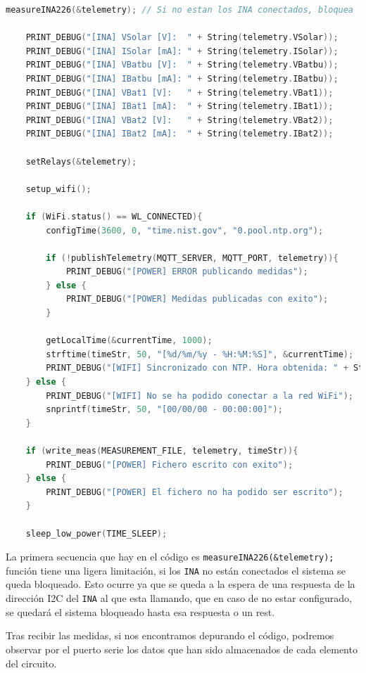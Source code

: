 \begin{lstlisting}[captionpos=b, caption={Codigo de la funcion loop}, language=c++]
    measureINA226(&telemetry); // Si no estan los INA conectados, bloquea

    PRINT_DEBUG("[INA] VSolar [V]:  " + String(telemetry.VSolar));
    PRINT_DEBUG("[INA] ISolar [mA]: " + String(telemetry.ISolar));
    PRINT_DEBUG("[INA] VBatbu [V]:  " + String(telemetry.VBatbu));
    PRINT_DEBUG("[INA] IBatbu [mA]: " + String(telemetry.IBatbu));
    PRINT_DEBUG("[INA] VBat1 [V]:   " + String(telemetry.VBat1));
    PRINT_DEBUG("[INA] IBat1 [mA]:  " + String(telemetry.IBat1));
    PRINT_DEBUG("[INA] VBat2 [V]:   " + String(telemetry.VBat2));
    PRINT_DEBUG("[INA] IBat2 [mA]:  " + String(telemetry.IBat2));

    setRelays(&telemetry);

    setup_wifi();

    if (WiFi.status() == WL_CONNECTED){
        configTime(3600, 0, "time.nist.gov", "0.pool.ntp.org");
        
        if (!publishTelemetry(MQTT_SERVER, MQTT_PORT, telemetry)){
            PRINT_DEBUG("[POWER] ERROR publicando medidas");
        } else {
            PRINT_DEBUG("[POWER] Medidas publicadas con exito");
        }

        getLocalTime(&currentTime, 1000);
        strftime(timeStr, 50, "[%d/%m/%y - %H:%M:%S]", &currentTime);
        PRINT_DEBUG("[WIFI] Sincronizado con NTP. Hora obtenida: " + String(timeStr));
    } else {
        PRINT_DEBUG("[WIFI] No se ha podido conectar a la red WiFi");
        snprintf(timeStr, 50, "[00/00/00 - 00:00:00]");
    }

    if (write_meas(MEASUREMENT_FILE, telemetry, timeStr)){
        PRINT_DEBUG("[POWER] Fichero escrito con exito");
    } else {
        PRINT_DEBUG("[POWER] El fichero no ha podido ser escrito");
    }

    sleep_low_power(TIME_SLEEP);
\end{lstlisting}

La primera secuencia que hay en el código es \texttt{measureINA226(\&telemetry);} función tiene una ligera limitación, si los \texttt{INA} no están conectados el sistema se queda bloqueado.
Esto ocurre ya que se queda a la espera de una respuesta de la dirección I2C del \texttt{INA} al que esta llamando, que en caso de no estar configurado, se quedará el sistema bloqueado hasta esa respuesta o un rest.

Tras recibir las medidas, si nos encontramos depurando el código, podremos observar por el puerto serie los datos que han sido almacenados de cada elemento del circuito.

